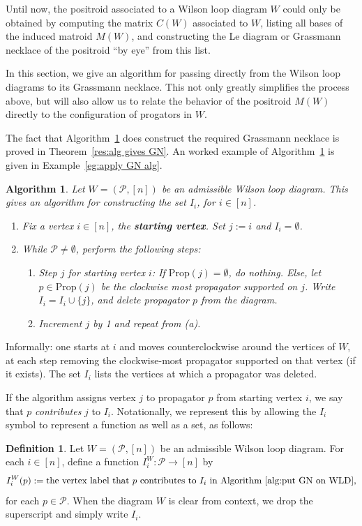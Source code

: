 \documentclass[11pt]{article}
\newcommand{\cP}{\mathcal{P}}
\newcommand{\Prop}{\textrm{Prop}}
\newtheorem{algorithm}[thm]{Algorithm}
\theoremstyle{remark}
\theoremstyle{definition}
\newtheorem{dfn}[thm]{Definition}
\begin{document}
Until now, the positroid associated to a Wilson loop diagram $W$ could only be obtained by computing the matrix $C(W)$ associated to $W$, listing all bases of the induced matroid $M(W)$, and constructing the Le diagram or Grassmann necklace of the positroid ``by eye'' from this list. 

In this section, we give an algorithm for passing directly from the Wilson loop diagrams to its Grassmann necklace. This not only greatly simplifies the process above, but will also allow us to relate the behavior of the positroid $M(W)$ directly to the configuration of progators in $W$.

The fact that Algorithm~\ref{alg:put GN on WLD} does construct the required Grassmann necklace is proved in Theorem~\ref{res:alg gives GN}. An worked example of Algorithm~\ref{alg:put GN on WLD} is given in Example~\ref{eg:apply GN alg}.

\begin{algorithm}\label{alg:put GN on WLD}
Let $W = (\cP, [n])$ be an admissible Wilson loop diagram. This gives an algorithm for constructing the set $I_i$, for $i \in [n]$.

\begin{enumerate}
\item Fix a vertex $i \in [n]$, the {\bf starting vertex}. Set $j:=i$ and $I_i = \emptyset$.
\item While $\cP \neq \emptyset$, perform the following steps:
\begin{enumerate}
\item {\em Step $j$ for starting vertex $i$}: If $\Prop(j) = \emptyset$, do nothing. Else, let $p \in \Prop(j)$ be the clockwise most propagator supported on $j$. Write $I_i = I_i\cup \{j\}$, and delete propagator $p$ from the diagram.
\item Increment $j$ by 1 and repeat from (a).
\end{enumerate}
\end{enumerate}
\end{algorithm}

Informally: one starts at $i$ and moves counterclockwise around the vertices of $W$, at each step removing the clockwise-most propagator supported on that vertex (if it exists). The set $I_i$ lists the vertices at which a propagator was deleted. 


If the algorithm assigns vertex $j$ to propagator $p$ from starting vertex $i$, we say that $p$ \emph{contributes} $j$ to $I_i$. Notationally, we represent this by allowing the $I_i$ symbol to represent a function as well as a set, as follows:
\begin{dfn}\label{def I_i as a function}
Let $W = (\cP, [n])$ be an admissible Wilson loop diagram. For each $i \in [n]$, define a function $I_i^W : \cP \longrightarrow [n]$ by
\[I_i^W(p) := \text{the vertex label that $p$ contributes to $I_i$ in Algorithm~\ref{alg:put GN on WLD},}\]
for each $p \in \cP$. When the diagram $W$ is clear from context, we drop the superscript and simply write $I_i$.
\end{dfn}
\end{document}
